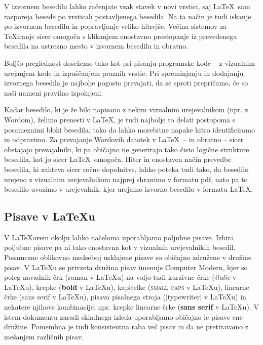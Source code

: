 \documentclass[9pt]{style/friteza}
\begin{document}
V izvornem besedilu lahko začenjate vsak stavek v novi vrstici, saj \LaTeX\ sam razporeja besede po vrsticah postavljenega besedila.
Na ta način je tudi iskanje po izvornem besedilu in popravljanje veliko hitrejše.
Večina sistemov za \TeX{}iranje sicer omogoča s klikanjem enostavno prestopanje iz prevedenega besedila na ustrezno mesto v izvornem besedilu in obratno.

Boljšo preglednost dosežemo tako kot pri pisanju programske kode -- z vizualnim urejanjem kode in izpuščanjem praznih vrstic.
Pri spreminjanju in dodajanju izvornega besedila je najbolje pogosto prevajati, da se sproti prepričamo, če so naši nameni pravilno izpolnjeni.

Kadar besedilo, ki je že bilo napisano z nekim vizualnim urejevalnikom (npr. z Wordom), želimo prenesti v \LaTeX, je tudi najbolje to delati postopoma s posameznimi bloki besedila,
tako da lahko morebitne napake hitro identificiramo in odpravimo.
Za prevajanje Wordovih datotek v \LaTeX\ -- in obratno -- sicer obstajajo prevajalniki, ki pa običajno ne generirajo tako čisto logične strukture besedila, kot jo sicer \LaTeX\ omogoča.
Hiter in enostaven način prevedbe besedila, ki  zahteva sicer ročne dopolnitve, lahko poteka tudi tako, da besedilo urejeno z vizualnim urejevalnikom najprej shranimo v formatu pdf,
nato pa to besedilo uvozimo v urejevalnik, kjer urejamo izvorno besedilo v formatu \LaTeX.

\subsection{Pisave v \LaTeX u}

V  \LaTeX ovem okolju lahko načeloma uporabljamo poljubne pisave.
Izbira poljubne pisave pa ni tako enostavna kot v vizualnih urejevalnikih besedil.
Posamezne oblikovno medseboj usklajene pisave so običajno združene v družine pisav.
V \LaTeX u se privzeta družina pisav imenuje Computer Modern,
kjer so poleg navadnih črk (roman v \LaTeX u) na voljo tudi kurzivne črke (\textit{italic} v \LaTeX u),
krepke (\textbf{bold} v \LaTeX u), kapitelke (\textsc{small caps} v \LaTeX u), linearne črke ({\textsf{sans serif} v \LaTeX u}), pisava pisalnega stroja (\ltx|typewriter| v \LaTeX u) in nekatere njihove kombinacije, npr. krepke linearne črke
({\textbf{\textsf{sans serif}} v \LaTeX u}).
V istem dokumentu zaradi skladnega izleda uporabljamo običajno le pisave ene družine.
Pomembna je tudi konsistentna raba več pisav in da ne pretiravamo z mešanjem različnih pisav.
\end{document}
